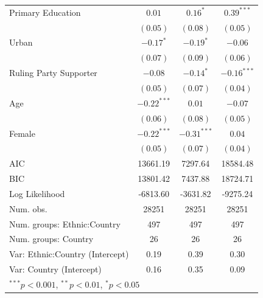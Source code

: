 \documentclass[12pt,]{book}
\let\origtable\table
\let\endorigtable\endtable
\renewenvironment{table}[1][2] {
    \singlespacing
    \expandafter\origtable\expandafter[H]
} {
    \endorigtable
}
\theoremstyle{definition}
\theoremstyle{definition}
\theoremstyle{definition}
\theoremstyle{remark}
\begin{document}
\begin{table}
\begin{center}
\begin{tabular}{l c c c }
Primary Education                       & $0.01$        & $0.16^{*}$    & $0.39^{***}$  \\
                                        & $(0.05)$      & $(0.08)$      & $(0.05)$      \\
Urban                                   & $-0.17^{*}$   & $-0.19^{*}$   & $-0.06$       \\
                                        & $(0.07)$      & $(0.09)$      & $(0.06)$      \\
Ruling Party Supporter                  & $-0.08$       & $-0.14^{*}$   & $-0.16^{***}$ \\
                                        & $(0.05)$      & $(0.07)$      & $(0.04)$      \\
Age                                     & $-0.22^{***}$ & $0.01$        & $-0.07$       \\
                                        & $(0.06)$      & $(0.08)$      & $(0.05)$      \\
Female                                  & $-0.22^{***}$ & $-0.31^{***}$ & $0.04$        \\
                                        & $(0.05)$      & $(0.07)$      & $(0.04)$      \\
\hline
AIC                                     & 13661.19      & 7297.64       & 18584.48      \\
BIC                                     & 13801.42      & 7437.88       & 18724.71      \\
Log Likelihood                          & -6813.60      & -3631.82      & -9275.24      \\
Num. obs.                               & 28251         & 28251         & 28251         \\
Num. groups: Ethnic:Country             & 497           & 497           & 497           \\
Num. groups: Country                    & 26            & 26            & 26            \\
Var: Ethnic:Country (Intercept)         & 0.19          & 0.39          & 0.30          \\
Var: Country (Intercept)                & 0.16          & 0.35          & 0.09          \\
\hline
\multicolumn{4}{l}{\scriptsize{$^{***}p<0.001$, $^{**}p<0.01$, $^*p<0.05$}}
\end{tabular}
\caption{Models with Matched Data}
\label{tab:matching}
\end{center}
\end{table}
\end{document}
